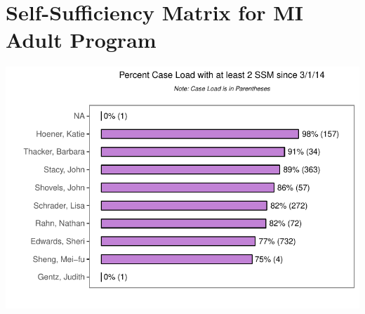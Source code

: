 \documentclass{article}\usepackage[]{graphicx}\usepackage[]{color}
\makeatletter
\def\maxwidth{ %
  \ifdim\Gin@nat@width>\linewidth
    \linewidth
  \else
    \Gin@nat@width
  \fi
}
\newenvironment{knitrout}{}{} %
\makeatother
\begin{document}
\pagebreak
\section{Self-Sufficiency Matrix for MI Adult Program}
\begin{knitrout}
\color{fgcolor}
\includegraphics[width=\maxwidth]{figure/ssm-1} 

\end{knitrout}
\end{document}
